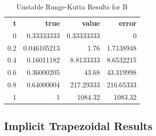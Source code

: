 \documentclass{article}
\begin{document}
\begin{table}[H]
\footnotesize
\centering
\caption{Unstable Runge-Kutta Results for B}
\label{tab:un_b_rk}
\begin{tabular}{rrrr}
\textbf{t} & \textbf{true} & \textbf{value} & \textbf{error} \\
0          & 0.33333333    & 0.33333333     & 0              \\
0.2        & 0.046105213   & 1.76           & 1.7138948      \\
0.4        & 0.16011182    & 8.8133333      & 8.6532215      \\
0.6        & 0.36000205    & 43.68          & 43.319998      \\
0.8        & 0.64000004    & 217.29333      & 216.65333      \\
1          & 1             & 1084.32        & 1083.32       
\end{tabular}
\end{table}


%
%
%

\subsection{Implicit Trapezoidal Results}
\label{results:implicit}
\end{document}
